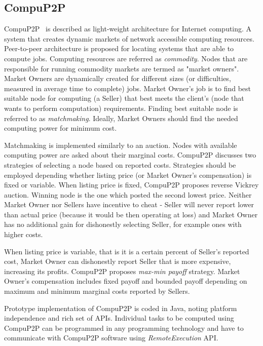 \begin{comment} 
http://boinc.berkeley.edu/trac/wiki/CompileApp
http://boinc.berkeley.edu/trac/wiki/VboxApps
http://boinc.berkeley.edu/wiki/Client_security_and_sandboxing
\end{comment}

\subsection{CompuP2P}

CompuP2P~\cite{gupta2006compup2p} is described as light-weight architecture for Internet computing. A system that creates dynamic markets of network accessible computing resources. Peer-to-peer architecture is proposed for locating systems that are able to compute jobs. Computing resources are referred as \emph{commodity}. Nodes that are responsible for running commodity markets are termed as "market owners". Market Owners are dynamically created for different sizes (or difficulties, measured in average time to complete) jobs. Market Owner's job is to find best suitable node for computing (a Seller) that best meets the client's (node that wants to perform computation) requirements. Finding best suitable node is referred to as \emph{matchmaking}. Ideally, Market Owners should find the needed computing power for minimum cost.

Matchmaking is implemented similarly to an auction. Nodes with available computing power are asked about their marginal costs. CompuP2P discusses two strategies of selecting a node based on reported costs. Strategies should be employed depending whether listing price (or Market Owner's compensation) is fixed or variable. When listing price is fixed, CompuP2P proposes reverse Vickrey auction. Winning node is the one which posted the second lowest price. Neither Market Owner nor Sellers have incentive to cheat - Seller will never report lower than actual price (because it would be then operating at loss) and Market Owner has no additional gain for dishonestly selecting Seller, for example ones with higher costs.

When listing price is variable, that is it is a certain percent of Seller's reported cost, Market Owner can dishonestly report Seller that is more expensive, increasing its profits. CompuP2P proposes \emph{max-min payoff} strategy. Market Owner's compensation includes fixed payoff and bounded payoff depending on maximum and minimum marginal costs reported by Sellers.

Prototype implementation of CompuP2P is coded in Java, noting platform independence and rich set of APIs. Individual tasks to be computed using CompuP2P can be programmed in any programming technology and have to communicate with CompuP2P software using \emph{RemoteExecution} API.

